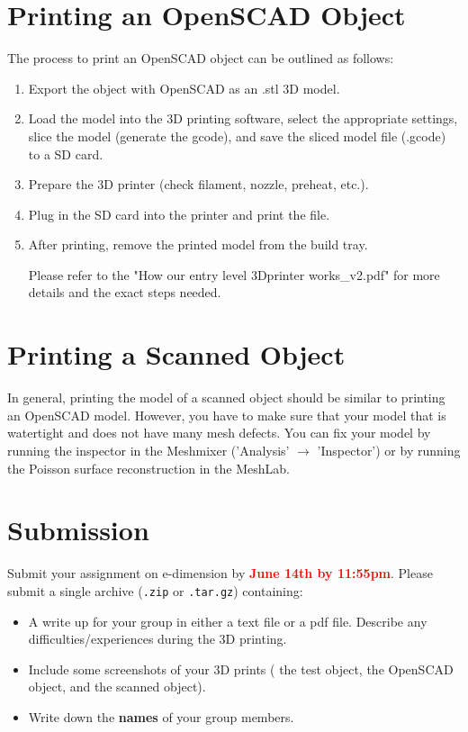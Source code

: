 \documentclass{article}
\begin{document}
\section{Printing an OpenSCAD Object}

The process to print an OpenSCAD object can be outlined as follows:

\begin{enumerate}
\item Export the object with OpenSCAD as an .stl 3D model.
\item Load the model into the 3D printing software, select the appropriate settings, slice the model (generate the gcode), and save the sliced model file (.gcode) to a SD card. 
\item Prepare the 3D printer (check filament, nozzle, preheat, etc.).
\item Plug in the SD card into the printer and print the file.
\item After printing, remove the printed model from the build tray.

Please refer to the "How our entry level 3D\-printer works\_v2.pdf" for more details and the exact steps needed.
\end{enumerate}

\section{Printing a Scanned Object}

In general, printing the model of a scanned object should be similar to printing an OpenSCAD model.
However, you have to make sure that your model that is watertight and does not have many mesh defects.
You can fix your model by running the inspector in the Meshmixer ('Analysis' $\rightarrow$ 'Inspector') or by running the Poisson surface
reconstruction in the MeshLab. 

\section{Submission}

\noindent Submit your assignment on e-dimension by \textcolor{red}{\textbf{June 14th by 11:55pm}}. Please submit a single archive (\texttt{.zip} or
\texttt{.tar.gz}) containing:

\begin{itemize}
\item A write up for your group in either a text file or a pdf file. Describe any difficulties/experiences during the
3D printing.
\item Include some screenshots of your 3D prints ( the test object, the OpenSCAD object, and the
scanned object).
\item Write down the \textbf{names} of your group members. 
\end{itemize}
\end{document}
